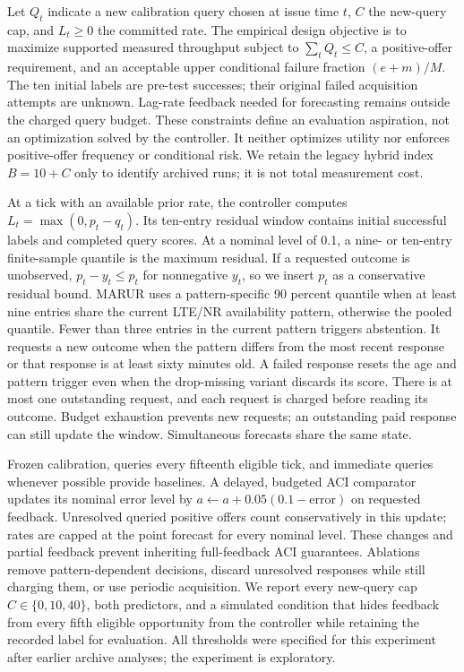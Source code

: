 \documentclass[journal,onecolumn,10pt]{IEEEtran}
\begin{document}
Let $Q_t$ indicate a new calibration query chosen at issue time $t$, $C$ the new-query cap, and $L_t\geq0$ the committed rate. The empirical design objective is to maximize supported measured throughput subject to $\sum_t Q_t\leq C$, a positive-offer requirement, and an acceptable upper conditional failure fraction $(e+m)/M$. The ten initial labels are pre-test successes; their original failed acquisition attempts are unknown. Lag-rate feedback needed for forecasting remains outside the charged query budget. These constraints define an evaluation aspiration, not an optimization solved by the controller. It neither optimizes utility nor enforces positive-offer frequency or conditional risk. We retain the legacy hybrid index $B=10+C$ only to identify archived runs; it is not total measurement cost.

At a tick with an available prior rate, the controller computes $L_t=\max(0,p_t-q_t)$. Its ten-entry residual window contains initial successful labels and completed query scores. At a nominal level of 0.1, a nine- or ten-entry finite-sample quantile is the maximum residual. If a requested outcome is unobserved, $p_t-y_t\leq p_t$ for nonnegative $y_t$, so we insert $p_t$ as a conservative residual bound. MARUR uses a pattern-specific 90 percent quantile when at least nine entries share the current LTE/NR availability pattern, otherwise the pooled quantile. Fewer than three entries in the current pattern triggers abstention. It requests a new outcome when the pattern differs from the most recent response or that response is at least sixty minutes old. A failed response resets the age and pattern trigger even when the drop-missing variant discards its score. There is at most one outstanding request, and each request is charged before reading its outcome. Budget exhaustion prevents new requests; an outstanding paid response can still update the window. Simultaneous forecasts share the same state.

Frozen calibration, queries every fifteenth eligible tick, and immediate queries whenever possible provide baselines. A delayed, budgeted ACI comparator updates its nominal error level by $a\leftarrow a+0.05(0.1-\mathrm{error})$ on requested feedback. Unresolved queried positive offers count conservatively in this update; rates are capped at the point forecast for every nominal level. These changes and partial feedback prevent inheriting full-feedback ACI guarantees. Ablations remove pattern-dependent decisions, discard unresolved responses while still charging them, or use periodic acquisition. We report every new-query cap $C\in\{0,10,40\}$, both predictors, and a simulated condition that hides feedback from every fifth eligible opportunity from the controller while retaining the recorded label for evaluation. All thresholds were specified for this experiment after earlier archive analyses; the experiment is exploratory.
\end{document}
